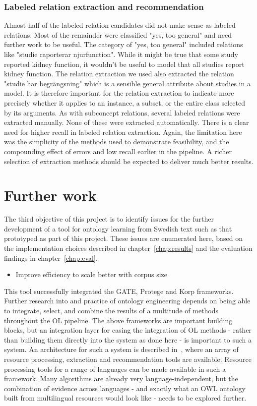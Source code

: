 \documentclass[a4paper]{report}
\begin{document}
\subsection{Labeled relation extraction and recommendation}

Almost half of the labeled relation candidates did not make sense as labeled relations.
Most of the remainder were classified "yes, too general" and need further work to be useful.
The category of "yes, too general" included relations like "studie raporterar njurfunction".
While it might be true that some study reported kidney function, it wouldn't be useful to model that all studies report kidney function.
The relation extraction we used also extracted the relation "studie har begrängsning" which is a sensible general attribute about studies in a model.
It is therefore important for the relation extraction to indicate more precisely whether it applies to an instance, a subset, or the entire class selected by its arguments.
As with subconcept relations, several labeled relations were extracted manually.
None of these were extracted automatically.
There is a clear need for higher recall in labeled relation extraction.
Again, the limitation here was the simplicity of the methods used to demonstrate feasibility, and the compounding effect of errors and low recall earlier in the pipeline.
A richer selection of extraction methods should be expected to deliver much better results.

\chapter{Further work}
\label{chap:further}

The third objective of this project is to identify issues for the further development of a tool for ontology learning from Swedish text such as that prototyped as part of this project.
These issues are enumerated here, based on the implementation choices described in chapter~\ref{chap:results} and the evaluation findings in chapter~\ref{chap:eval}.

\begin{itemize}
\item Improve efficiency to scale better with corpus size
\end{itemize}

This tool successfully integrated the GATE, Protege and Korp frameworks.
Further research into and practice of ontology engineering depends on being able to integrate, select, and combine the results of a multitude of methods throughout the OL pipeline.
The above frameworks are important building blocks, but an integration layer for easing the integration of OL methods - rather than building them directly into the system as done here - is important to such a system.
An architecture for such a system is described in~\citep{Cimiano2009OL}, where an array of resource processing, extraction and recommendation tools are available.
Resource processing tools for a range of languages can be made available in such a framework.
Many algorithms are already very language-independent, but the combination of evidence across languages - and exactly what an OWL ontology built from multilingual resources would look like - needs to be explored further.
\end{document}
